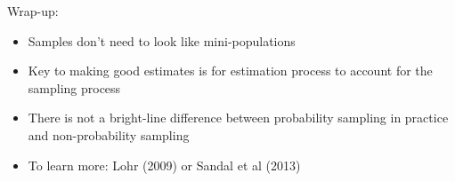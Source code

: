 \documentclass[aspectratio=169]{beamer}
\begin{document}
\begin{frame}

\begin{center}
\end{center}

\end{frame}
\begin{frame}

Wrap-up:
\begin{itemize}
\item Samples don't need to look like mini-populations
\pause
\item Key to making good estimates is for estimation process to account for the sampling process
\pause
\item There is not a bright-line difference between probability sampling in practice and non-probability sampling
\pause
\item To learn more: Lohr (2009) or Sandal et al (2013)
\end{itemize}

\end{frame}
\end{document}
